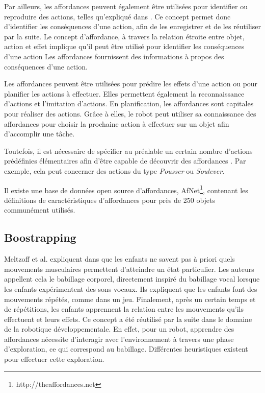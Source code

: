 \documentclass[draft]{llncs}
\begin{document}
Par ailleurs, les affordances peuvent également être utilisées pour identifier ou reproduire des actions, telles qu'expliqué dans \cite{4399517}.
Ce concept permet donc d'identifier les conséquences d'une action, afin de les enregistrer et de les réutiliser par la suite.
Le concept d'affordance, à travers la relation étroite entre objet, action et effet implique qu'il peut être utilisé pour identifier les conséquences d'une action
Les affordances fournissent des informations à propos des conséquences d'une action.

Les affordances peuvent être utilisées pour prédire les effets d'une action ou pour planifier les actions à effectuer.
Elles permettent également la reconnaissance d'actions et l'imitation d'actions.
En planification, les affordances sont capitales pour réaliser des actions.
Grâce à elles, le robot peut utiliser sa connaissance des affordances pour choisir la prochaine action à effectuer sur un objet afin d'accomplir une tâche.

Toutefois, il est nécessaire de spécifier au préalable un certain nombre d'actions prédéfinies élémentaires afin d'être capable de découvrir des affordances \cite{Montesano2008}.
Par exemple, cela peut concerner des actions du type \textit{Pousser} ou \textit{Soulever}.

Il existe une base de données open source d'affordances, AfNet\footnote{http://theaffordances.net}, contenant les définitions de caractéristiques d'affordances pour près de 250 objets communément utilisés. 




\subsection{Boostrapping}

Meltzoff et al. expliquent dans \cite{EDP:EDP157} que les enfants ne savent pas à priori quels mouvements musculaires permettent d'atteindre un état particulier.
Les auteurs appellent cela le babillage corporel, directement inspiré du babillage vocal lorsque les enfants expérimentent des sons vocaux.
Ils expliquent que les enfants font des mouvements répétés, comme dans un jeu.
Finalement, après un certain temps et de répétitions, les enfants apprennent la relation entre les mouvements qu'ils effectuent et leurs effets.
Ce concept a été réutilisé par la suite dans le domaine de la robotique développementale.
En effet, pour un robot, apprendre des affordances nécessite d'interagir avec l'environnement à travers une phase d'exploration, ce qui correspond au babillage. Différentes heuristiques existent pour effectuer cette exploration.
\end{document}

